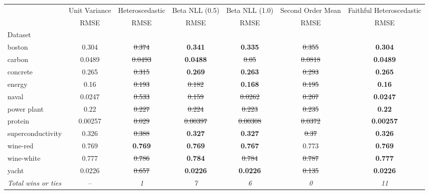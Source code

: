 \begin{tabular}{l|c|c|c|c|c|c}
\toprule
{} & {Unit Variance} & {Heteroscedastic} & {Beta NLL (0.5)} & {Beta NLL (1.0)} & {Second Order Mean} & {Faithful Heteroscedastic} \\
{} & {RMSE} & {RMSE} & {RMSE} & {RMSE} & {RMSE} & {RMSE} \\
{Dataset} & {} & {} & {} & {} & {} & {} \\
\midrule
boston & 0.304 & \sout{0.374} & \textbf{0.341} & \textbf{0.335} & \sout{0.355} & \textbf{0.304} \\
carbon & 0.0489 & \sout{0.0493} & \textbf{0.0488} & \sout{0.05} & \sout{0.0818} & \textbf{0.0489} \\
concrete & 0.265 & \sout{0.315} & \textbf{0.269} & \textbf{0.263} & \sout{0.293} & \textbf{0.265} \\
energy & 0.16 & \sout{0.193} & \sout{0.182} & \textbf{0.168} & \sout{0.195} & \textbf{0.16} \\
naval & 0.0247 & \sout{0.533} & \sout{0.159} & \sout{0.0262} & \sout{0.207} & \textbf{0.0247} \\
power plant & 0.22 & \sout{0.227} & \sout{0.224} & \sout{0.223} & \sout{0.235} & \textbf{0.22} \\
protein & 0.00257 & \sout{0.029} & \sout{0.00397} & \sout{0.00308} & \sout{0.0372} & \textbf{0.00257} \\
superconductivity & 0.326 & \sout{0.388} & \textbf{0.327} & \textbf{0.327} & \sout{0.37} & \textbf{0.326} \\
wine-red & 0.769 & \textbf{0.769} & \textbf{0.769} & \textbf{0.767} & 0.773 & \textbf{0.769} \\
wine-white & 0.777 & \sout{0.786} & \textbf{0.784} & \sout{0.784} & \sout{0.787} & \textbf{0.777} \\
yacht & 0.0226 & \sout{0.657} & \textbf{0.0226} & \textbf{0.0226} & \sout{0.135} & \textbf{0.0226} \\
\textit{{Total wins or ties}} & -- & \textit{1} & \textit{7} & \textit{6} & \textit{0} & \textit{11} \\
\bottomrule
\end{tabular}
